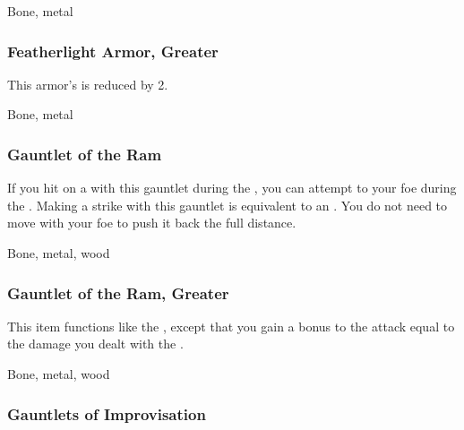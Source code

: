  Bone, metal


\lowercase{\hypertarget{item:Featherlight Armor, Greater}{}}\label{item:Featherlight Armor, Greater}
\hypertarget{item:Featherlight Armor, Greater}{\subsubsection{Featherlight Armor, Greater\hfill{}}}

This armor's  is reduced by 2.



 Bone, metal


\lowercase{\hypertarget{item:Gauntlet of the Ram}{}}\label{item:Gauntlet of the Ram}
\hypertarget{item:Gauntlet of the Ram}{\subsubsection{Gauntlet of the Ram\hfill{}}}

If you hit on a  with this gauntlet during the , you can attempt to  your foe during the .
Making a strike with this gauntlet is equivalent to an .
You do not need to move with your foe to push it back the full distance.



 


 Bone, metal, wood


\lowercase{\hypertarget{item:Gauntlet of the Ram, Greater}{}}\label{item:Gauntlet of the Ram, Greater}
\hypertarget{item:Gauntlet of the Ram, Greater}{\subsubsection{Gauntlet of the Ram, Greater\hfill{}}}

This item functions like the , except that you gain a bonus to the  attack equal to the damage you dealt with the .



 


 Bone, metal, wood


\lowercase{\hypertarget{item:Gauntlets of Improvisation}{}}\label{item:Gauntlets of Improvisation}
\hypertarget{item:Gauntlets of Improvisation}{\subsubsection{Gauntlets of Improvisation\hfill{}}}

